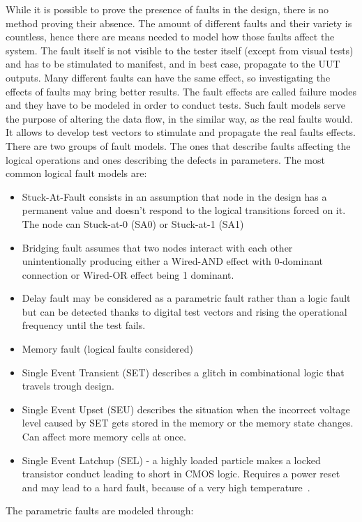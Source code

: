 While it is possible to prove the presence of faults in the design, there is no method proving their absence. The amount of different faults and their variety is countless, hence there are means needed to model how those faults affect the system. The fault itself is not visible to the tester itself (except from visual tests) and has to be stimulated to manifest, and in best case, propagate to the UUT outputs. Many different faults can have the same effect, so investigating the effects of faults may bring better results. The fault effects are called failure modes and they have to be modeled in order to conduct tests. Such fault models serve the purpose of altering the data flow, in the similar way, as the real faults would. It allows to develop test vectors to stimulate and propagate the real faults effects. There are two groups of fault models. The ones that describe faults affecting the logical operations and ones describing the defects in parameters. The most common logical fault models are:
\begin{itemize}
    \item Stuck-At-Fault consists in an assumption that node in the design has a permanent value and doesn't respond to the logical transitions forced on it. The node can Stuck-at-0 (SA0) or Stuck-at-1 (SA1)
    \item Bridging fault assumes that two nodes interact with each other unintentionally producing either a Wired-AND effect with 0-dominant connection or Wired-OR effect being 1 dominant.
    \item Delay fault may be considered as a parametric fault rather than a logic fault but can be detected thanks to digital test vectors and rising the operational frequency until the test fails. 
    \item Memory fault (logical faults considered)
    \item Single Event Transient (SET) describes a glitch in combinational logic that travels trough design.
    \item Single Event Upset (SEU) describes the situation when the incorrect voltage level caused by SET gets stored in the memory or the memory state changes. Can affect more memory cells at once.
    \item Single Event Latchup (SEL) - a highly loaded particle makes a locked transistor conduct leading to short in CMOS logic. Requires a power reset and may lead to a hard fault, because of a very high temperature~\cite{report:altera}.
\end{itemize}
The parametric faults are modeled through:
